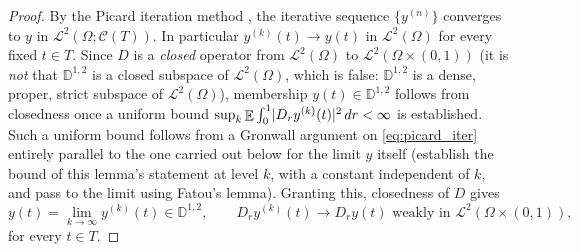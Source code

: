 \documentclass[11pt, a4paper]{article}
\theoremstyle{theoremstyle}
\theoremstyle{definitionstyle}
\newcommand{\dd}{\mathop{}\!d}
\DeclareMathOperator{\EE}{\mathbb E}
\DeclarePairedDelimiter{\abs}{\lvert}{\rvert}
\begin{document}
\begin{proof}
    By the Picard iteration method \cite{MAO1995281}, the iterative sequence $\{y^{(n)}\}$ converges to $y$ in $\mathcal L^2(\Omega; \mathcal C(T))$. In particular $y^{(k)}(t) \to y(t)$ in $\mathcal L^2(\Omega)$ for every fixed $t \in T$. Since $D$ is a \emph{closed} operator from $\mathcal L^2(\Omega)$ to $\mathcal L^2(\Omega\times(0,1))$ (it is \emph{not} that $\mathbb D^{1,2}$ is a closed subspace of $\mathcal L^2(\Omega)$, which is false: $\mathbb D^{1,2}$ is a dense, proper, strict subspace of $\mathcal L^2(\Omega)$), membership $y(t) \in \mathbb D^{1,2}$ follows from closedness once a uniform bound $\sup_k \EE\int_0^1\abs{D_ry^{(k)}(t)}^2\dd{r} < \infty$ is established. Such a uniform bound follows from a Gronwall argument on \eqref{eq:picard_iter} entirely parallel to the one carried out below for the limit $y$ itself (establish the bound of this lemma's statement at level $k$, with a constant independent of $k$, and pass to the limit using Fatou's lemma). Granting this, closedness of $D$ gives
    \begin{equation}
        y(t) = \lim_{k \to \infty} y^{(k)}(t) \in \mathbb D^{1, 2}, \qquad D_ry^{(k)}(t) \to D_ry(t) \text{ weakly in } \mathcal L^2(\Omega\times(0,1)),
    \end{equation}
    for every $t \in T$.


\end{proof}
\end{document}
